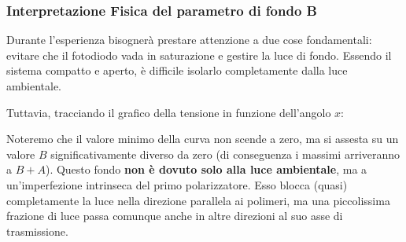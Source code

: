 \documentclass[openany,a4paper,12pt]{book}
\begin{document}
\subsubsection*{Interpretazione Fisica del parametro di fondo B}
Durante l'esperienza bisognerà prestare attenzione a due cose fondamentali: evitare che il fotodiodo vada in saturazione e gestire la luce di fondo. Essendo il sistema compatto e aperto, è difficile isolarlo completamente dalla luce ambientale. 

Tuttavia, tracciando il grafico della tensione in funzione dell'angolo $x$:
\begin{center}
    

\end{center}
Noteremo che il valore minimo della curva non scende a zero, ma si assesta su un valore $B$ significativamente diverso da zero (di conseguenza i massimi arriveranno a $B + A$). 
Questo fondo \textbf{non è dovuto solo alla luce ambientale}, ma a un'imperfezione intrinseca del primo polarizzatore. Esso blocca (quasi) completamente la luce nella direzione parallela ai polimeri, ma una piccolissima frazione di luce passa comunque anche in altre direzioni al suo asse di trasmissione.
\end{document}
